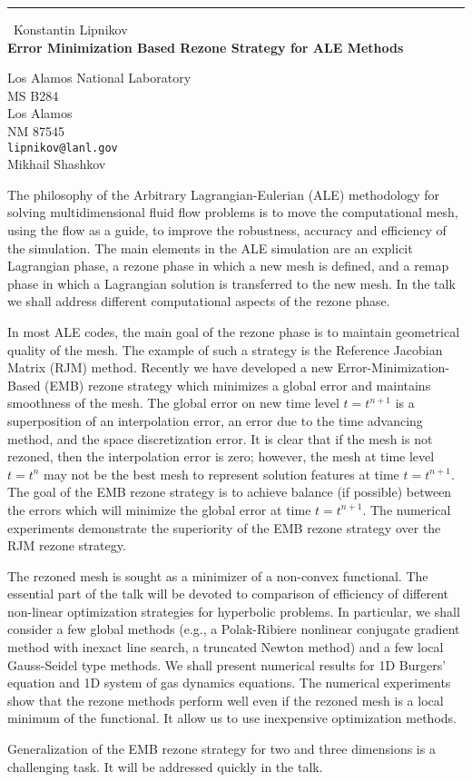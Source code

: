 \documentclass{report}
\begin{document}
\begin{center}
\rule{6in}{1pt} \
{\large Konstantin Lipnikov \\
{\bf Error Minimization Based Rezone Strategy for ALE Methods}}

Los Alamos National Laboratory \\ MS B284 \\ Los Alamos \\ NM 87545
\\
{\tt lipnikov@lanl.gov}\\
Mikhail Shashkov\end{center}

The philosophy of the Arbitrary Lagrangian-Eulerian (ALE)
methodology for solving multidimensional fluid flow problems
is to move the computational mesh, using the flow as a guide,
to improve the robustness, accuracy and efficiency of the simulation. The
main elements in the ALE simulation are an
explicit Lagrangian phase, a rezone phase in which a new mesh
is defined, and a remap phase in which a Lagrangian solution
is transferred to the new mesh. In the talk we shall address
different computational aspects of the rezone phase.


In most ALE codes, the main goal of the rezone phase is to
maintain geometrical quality of the mesh. The example of such
a strategy is the Reference Jacobian Matrix (RJM) method.
Recently we have developed a new Error-Minimization-Based (EMB)
rezone strategy which minimizes a global error and maintains
smoothness of the mesh. The global error on new time level
$t=t^{n+1}$ is a superposition of an interpolation error, an
error due to the time advancing method, and the space
discretization error. It is clear that if the mesh is not rezoned,
then the interpolation error is zero; however, the mesh at time
level $t=t^n$ may not be the best mesh to represent solution features at
time $t=t^{n+1}$. The goal of the EMB rezone strategy is to achieve
balance (if possible) between the errors which will minimize the global
error at time $t=t^{n+1}$. The numerical experiments demonstrate the
superiority of the EMB rezone strategy over the RJM rezone strategy.


The rezoned mesh is sought as a minimizer of a non-convex functional. The
essential part of the talk will be devoted to comparison of efficiency of
different non-linear optimization strategies for hyperbolic problems. In
particular, we shall consider a few global methods (e.g., a Polak-Ribiere
nonlinear conjugate gradient method with inexact line search, a truncated
Newton method) and a few local Gauss-Seidel type methods. We shall
present numerical results for 1D Burgers' equation and 1D system of gas
dynamics equations. The numerical experiments show that the rezone
methods perform well even if the rezoned mesh is a local
minimum of the functional. It allow us to use inexpensive optimization methods.


Generalization of the EMB rezone strategy for two and three dimensions is
a challenging task. It will be addressed quickly in the talk.
\end{document}
